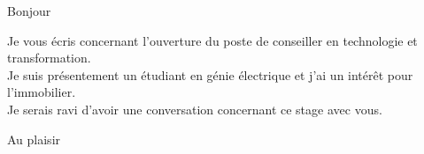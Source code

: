 \documentclass[french,12pt]{letter}
\begin{document}

\begin{letter}{}
\address{Montréal, Canada}

\opening{Bonjour}

Je vous écris concernant l'ouverture du poste de conseiller en technologie et transformation.\\
Je suis présentement un étudiant en génie électrique et j'ai un intérêt pour l'immobilier.\\
Je serais ravi d'avoir une conversation concernant ce stage avec vous.
\signature{Maxime}

\closing{Au plaisir}


\end{letter}
\end{document}
